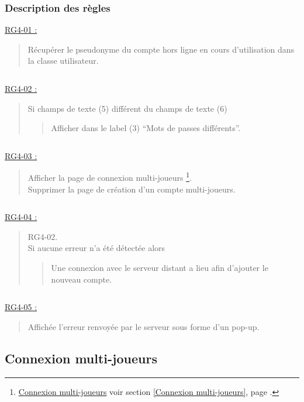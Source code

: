 \documentclass{report}
\begin{document}
		\subsubsection{Description des règles}

			\underline{RG4-01 :}
				\begin{quote}
					Récupérer le pseudonyme du compte hors ligne en cours d'utilisation dans la classe utilisateur.
				\end{quote}

		$\,$

			\underline{RG4-02 :}
				\begin{quote}
					Si champs de texte (5) différent du champs de texte (6)
					\begin{quote}
						Afficher dans le label (3) ``Mots de passes différents''.
					\end{quote}
				\end{quote}

			$\,$				
				
			\underline{RG4-03 :}
				\begin{quote}
					Afficher la page de connexion multi-joueurs%
						\footnote[1]{
							\hyperlink{Connexion multi-joueurs}{Connexion multi-joueurs}
							\og voir section \ref{Connexion multi-joueurs}, page \pageref{Connexion multi-joueurs}.\fg
						}.\\
					Supprimer la page de création d'un compte multi-joueurs.\\
				\end{quote}
				
			$\,$

			\underline{RG4-04 :}
				\begin{quote}
					RG4-02.\\
					Si aucune erreur n'a été détectée alors
						\begin{quote}
							Une connexion avec le serveur distant a lieu afin d'ajouter le nouveau compte.\\
						\end{quote}
				\end{quote}
				
			$\,$
				
			\underline{RG4-05 :}
				\begin{quote}
					Affichée l'erreur renvoyée par le serveur sous forme d'un pop-up.
				\end{quote}
	
\newpage

	\subsection{Connexion multi-joueurs}
	
\end{document}
